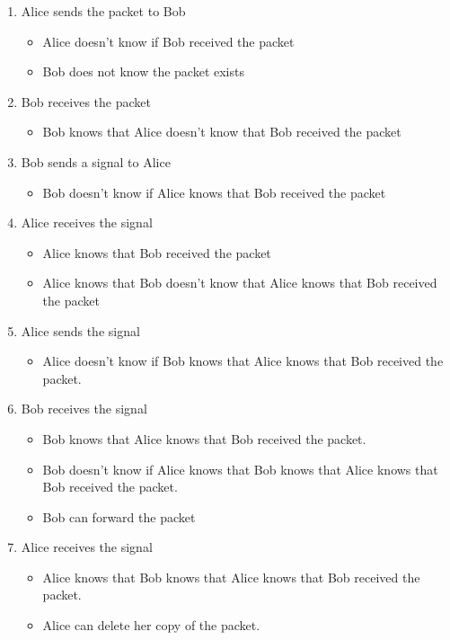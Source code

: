 \documentclass[../HFT-main.tex]{subfiles}
\begin{document}
\begin{enumerate}
\item Alice sends the packet to Bob
	\begin{itemize}
	\item Alice doesn’t know if Bob received the packet
	\item Bob does not know the packet exists
	\end{itemize}
\item Bob receives the packet
	\begin{itemize}
	\item Bob knows that Alice doesn’t know that Bob received the packet
	\end{itemize}
\item Bob sends a signal to Alice
	\begin{itemize}
	\item Bob doesn’t know if Alice knows that Bob received the packet
	\end{itemize}
\item Alice receives the signal
	\begin{itemize}
	\item Alice knows that Bob received the packet
	\item Alice knows that Bob doesn’t know that Alice knows that Bob received the
packet
	\end{itemize}
\item Alice sends the signal
	\begin{itemize}
	\item Alice doesn’t know if Bob knows that Alice knows that Bob received the
packet.
	\end{itemize}
\item Bob receives the signal
	\begin{itemize}
	\item Bob knows that Alice knows that Bob received the packet.
	\item Bob doesn’t know if Alice knows that Bob knows that Alice knows that Bob
received the packet.
	\item Bob can forward the packet
	\end{itemize}
\item Alice receives the signal
	\begin{itemize}
	\item Alice knows that Bob knows that Alice knows that Bob received the packet.
	\item Alice can delete her copy of the packet.
	\end{itemize}
\end{enumerate}
\end{document}

